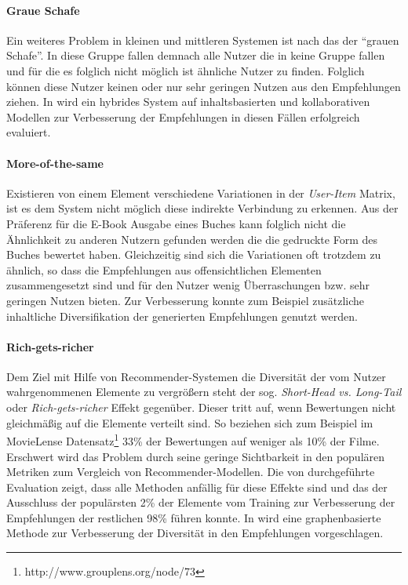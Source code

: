 \paragraph{Graue Schafe} Ein weiteres Problem in kleinen und mittleren Systemen ist nach \citep{claypool99} das der ``grauen Schafe''. In diese Gruppe fallen demnach alle Nutzer die in keine Gruppe fallen und für die es folglich nicht möglich ist ähnliche Nutzer zu finden. Folglich können diese Nutzer keinen oder nur sehr geringen Nutzen aus den Empfehlungen ziehen. In \citep{claypool99} wird ein hybrides System auf inhaltsbasierten und kollaborativen Modellen zur Verbesserung der Empfehlungen in diesen Fällen erfolgreich evaluiert. \citep{Burke:2002:HRS:586321.586352}

\paragraph{More-of-the-same} Existieren von einem Element verschiedene Variationen in der \textit{User-Item} Matrix, ist es dem System nicht möglich diese indirekte Verbindung zu erkennen. Aus der Präferenz für die E-Book Ausgabe eines Buches kann folglich nicht die Ähnlichkeit zu anderen Nutzern gefunden werden die die gedruckte Form des Buches bewertet haben. Gleichzeitig sind sich die Variationen oft trotzdem zu ähnlich, so dass die Empfehlungen aus offensichtlichen Elementen zusammengesetzt sind und für den Nutzer wenig Überraschungen bzw. sehr geringen Nutzen bieten. Zur Verbesserung konnte zum Beispiel zusätzliche inhaltliche Diversifikation der generierten Empfehlungen genutzt werden. \citep[Kap. 3]{rs}

\paragraph{Rich-gets-richer}\label{sec:richgetsricher} Dem Ziel mit Hilfe von Recommender-Systemen die Diversität der vom Nutzer wahrgenommenen Elemente zu vergrößern steht der sog. \textit{Short-Head vs. Long-Tail} oder \textit{Rich-gets-richer} Effekt gegenüber. Dieser tritt auf, wenn Bewertungen nicht gleichmäßig auf die Elemente verteilt sind. So beziehen sich zum Beispiel im MovieLense Datensatz\footnote{http://www.grouplens.org/node/73} 33\% der Bewertungen auf weniger als 10\% der Filme. Erschwert wird das Problem durch seine geringe Sichtbarkeit in den populären Metriken zum Vergleich von Recommender-Modellen. Die von \citep{Cremonesi:2010:PRA:1864708.1864721} durchgeführte Evaluation zeigt, dass alle Methoden anfällig für diese Effekte sind und das der Ausschluss der populärsten 2\% der Elemente vom Training zur Verbesserung der Empfehlungen der restlichen 98\% führen konnte. In \citep{Yin:2012:CLT:2311906.2311916} wird eine graphenbasierte Methode zur Verbesserung der Diversität in den Empfehlungen vorgeschlagen.

